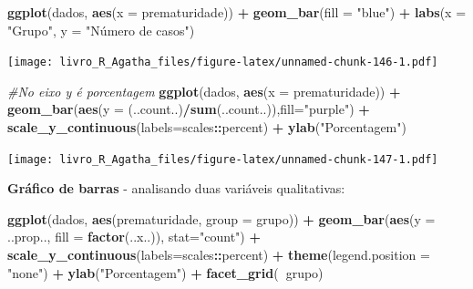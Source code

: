 \documentclass[
]{book}
\newenvironment{Shaded}{\begin{snugshade}}{\end{snugshade}}
\newcommand{\CommentTok}[1]{\textcolor[rgb]{0.56,0.35,0.01}{\textit{#1}}}
\newcommand{\DataTypeTok}[1]{\textcolor[rgb]{0.13,0.29,0.53}{#1}}
\newcommand{\KeywordTok}[1]{\textcolor[rgb]{0.13,0.29,0.53}{\textbf{#1}}}
\newcommand{\NormalTok}[1]{#1}
\newcommand{\OperatorTok}[1]{\textcolor[rgb]{0.81,0.36,0.00}{\textbf{#1}}}
\newcommand{\StringTok}[1]{\textcolor[rgb]{0.31,0.60,0.02}{#1}}
\begin{document}
\begin{Shaded}
\begin{Highlighting}[]
\KeywordTok{ggplot}\NormalTok{(dados, }\KeywordTok{aes}\NormalTok{(}\DataTypeTok{x =}\NormalTok{ prematuridade)) }\OperatorTok{+}
\StringTok{  }\KeywordTok{geom_bar}\NormalTok{(}\DataTypeTok{fill =} \StringTok{"blue"}\NormalTok{) }\OperatorTok{+}
\StringTok{  }\KeywordTok{labs}\NormalTok{(}\DataTypeTok{x =} \StringTok{"Grupo"}\NormalTok{, }\DataTypeTok{y =} \StringTok{"Número de casos"}\NormalTok{)}
\end{Highlighting}
\end{Shaded}

\texttt{[image: livro\_R\_Agatha\_files/figure-latex/unnamed-chunk-146-1.pdf]}

\begin{Shaded}
\begin{Highlighting}[]
\CommentTok{#No eixo y é porcentagem}
\KeywordTok{ggplot}\NormalTok{(dados, }\KeywordTok{aes}\NormalTok{(}\DataTypeTok{x =}\NormalTok{ prematuridade)) }\OperatorTok{+}\StringTok{  }
\StringTok{  }\KeywordTok{geom_bar}\NormalTok{(}\KeywordTok{aes}\NormalTok{(}\DataTypeTok{y =}\NormalTok{ (..count..)}\OperatorTok{/}\KeywordTok{sum}\NormalTok{(..count..)),}\DataTypeTok{fill=}\StringTok{"purple"}\NormalTok{) }\OperatorTok{+}\StringTok{ }
\StringTok{  }\KeywordTok{scale_y_continuous}\NormalTok{(}\DataTypeTok{labels=}\NormalTok{scales}\OperatorTok{::}\NormalTok{percent) }\OperatorTok{+}
\StringTok{  }\KeywordTok{ylab}\NormalTok{(}\StringTok{"Porcentagem"}\NormalTok{)}
\end{Highlighting}
\end{Shaded}

\texttt{[image: livro\_R\_Agatha\_files/figure-latex/unnamed-chunk-147-1.pdf]}

\textbf{Gráfico de barras} - analisando duas variáveis qualitativas:

\begin{Shaded}
\begin{Highlighting}[]
\KeywordTok{ggplot}\NormalTok{(dados, }\KeywordTok{aes}\NormalTok{(prematuridade, }\DataTypeTok{group =}\NormalTok{ grupo)) }\OperatorTok{+}\StringTok{ }
\StringTok{  }\KeywordTok{geom_bar}\NormalTok{(}\KeywordTok{aes}\NormalTok{(}\DataTypeTok{y =}\NormalTok{ ..prop.., }\DataTypeTok{fill =} \KeywordTok{factor}\NormalTok{(..x..)), }\DataTypeTok{stat=}\StringTok{"count"}\NormalTok{) }\OperatorTok{+}\StringTok{ }
\StringTok{  }\KeywordTok{scale_y_continuous}\NormalTok{(}\DataTypeTok{labels=}\NormalTok{scales}\OperatorTok{::}\NormalTok{percent) }\OperatorTok{+}
\StringTok{  }\KeywordTok{theme}\NormalTok{(}\DataTypeTok{legend.position =} \StringTok{"none"}\NormalTok{) }\OperatorTok{+}
\StringTok{  }\KeywordTok{ylab}\NormalTok{(}\StringTok{"Porcentagem"}\NormalTok{) }\OperatorTok{+}
\StringTok{  }\KeywordTok{facet_grid}\NormalTok{(}\OperatorTok{~}\NormalTok{grupo)}
\end{Highlighting}
\end{Shaded}
\end{document}
